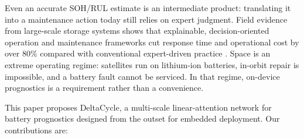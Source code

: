 Even an
accurate SOH/RUL estimate is an intermediate product: translating
it into a maintenance action today still relies on expert judgment.
Field evidence from large-scale storage systems shows that
explainable, decision-oriented operation and maintenance frameworks
cut response time and operational cost by over 80\% compared with
conventional expert-driven practice \cite{ref_qu_bess}. Space is an extreme operating regime: satellites run on
lithium-ion batteries, in-orbit repair is impossible, and a battery fault
cannot be serviced. In that regime, on-device prognostics is a requirement
rather than a convenience.

This paper proposes DeltaCycle, a multi-scale linear-attention
network for battery prognostics designed from the outset for embedded
deployment. Our contributions are:

